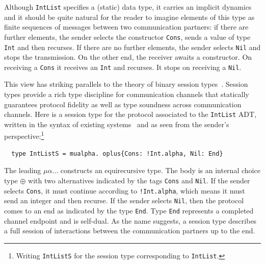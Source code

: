Although \lstinline+IntList+ specifies a (static) data type, 
it carries an implicit dynamics and it should be 
quite natural for the reader to imagine elements of this type as
finite sequences of messages between two communication partners: if
there are  further elements, the sender selects the  
constructor \lstinline+Cons+, sends a value of type 
\lstinline+Int+ and then recurses. If there are no further elements,
the sender selects \lstinline+Nil+ and stops the transmission. 
On the other end, the receiver awaits a constructor. On receiving a
\lstinline+Cons+ it receives an \lstinline+Int+ and recurses. It stops
on receiving a \lstinline+Nil+. 


This view has striking parallels to the theory of binary session
types~\cite{DBLP:conf/concur/Honda93,DBLP:conf/esop/HondaVK98,DBLP:conf/parle/TakeuchiHK94}.
Session types provide a rich type discipline for communication channels that
statically guarantees protocol fidelity as well as type soundness across
communication channels. Here is a session type for the protocol associated to
the \lstinline+IntList+ ADT, written in the syntax of existing
systems~\cite{DBLP:journals/corr/abs-2106-06658,lindley17:_light_funct_session_types,DBLP:journals/jfp/GayV10}
and as seen from the sender's perspective:\footnote{Writing
  \lstinline+IntListS+ for the session type corresponding to
  \lstinline+IntList+.}
%
\begin{lstlisting}
  type IntListS = mualpha. oplus{Cons: !Int.alpha, Nil: End}
\end{lstlisting}
%
The leading $\mu\alpha\dots$ constructs an equirecursive type. The body is
an internal choice type $\oplus$ with two alternatives indicated by the tags
\lstinline+Cons+ and \lstinline+Nil+. If the sender selects
\lstinline+Cons+, it must continue according to
\lstinline+!Int.alpha+, which means it must send an integer and then
recurse. If the sender selects \lstinline+Nil+, then the protocol
comes to an end as indicated by the type \lstinline+End+.
%
Type \lstinline+End+ represents a completed channel endpoint and is self-dual.
%
As the name
suggests, a session type describes a full session of interactions
between the communication partners up to the end.

